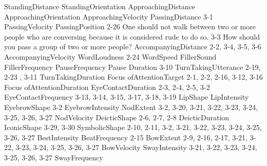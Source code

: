  
StandingDistance
StandingOrientation
ApproachingDistance
ApproachingOrientation
ApproachingVelocity
PassingDistance
	3-1 
PassingVelocity
PassingPosition
	2-26 One should not walk between two or more people who are conversing because it is considered rude to do so.
	3-3 How should you pass a group of two or more people?
AccompanyingDistance
	2-2, 3-4, 3-5, 3-6 
AccompanyingVelocity
WordLoudness
	2-24 
WordSpeed
FillerSound
FillerFrequency
PauseFrequency
Pause Duration		
	3-10  
TurnTakingUtterance
	2-19, 2-23 , 3-11
TurnTakingDuration
Focus ofAttentionTarget
	2-1, 2-2, 2-16, 3-12, 3-16 
Focus ofAttentionDuration
EyeContactDuration
	2-3, 2-4, 2-5, 3-2 
EyeContactFrequency
	3-13, 3-14, 3-15, 3-17, 3-18, 3-19 
LipShape
LipIntensity
EyebrowShape
 	3-2 
EyebrowIntensity
NodExtent
 	3-2, 3-20, 3-21, 3-22, 3-23, 3-24, 3-25, 3-26, 3-27 
NodVelocity
DeicticShape
	2-6, 2-7, 2-8  
DeicticDuration
IconicShape
	3-29, 3-30  
SymbolicShape
	2-10, 2-11, 3-2, 3-21, 3-22, 3-23, 3-24, 3-25, 3-26, 3-27  
BestIntensity
BeatFrequency
	2-15
BowExtent
	2-9, 2-16, 2-17, 3-21, 3-22, 3-23, 3-24, 3-25, 3-26, 3-27
BowVelocity
SwayIntensity
	3-21, 3-22, 3-23, 3-24, 3-25, 3-26, 3-27
SwayFrequency



